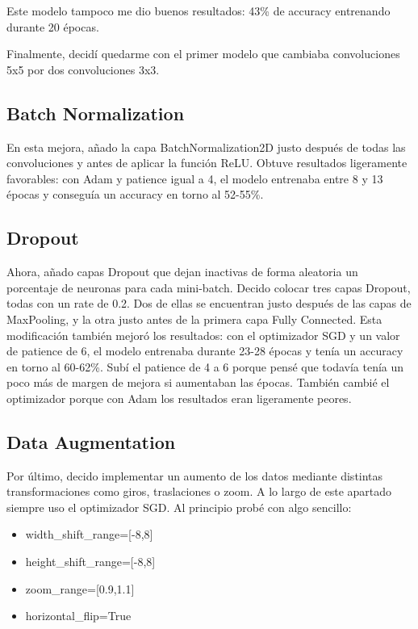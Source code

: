 \documentclass[10pt,a4paper]{article}
\begin{document}
Este modelo tampoco me dio buenos resultados: 43\% de accuracy entrenando durante 20 épocas.

Finalmente, decidí quedarme con el primer modelo que cambiaba convoluciones 5x5 por dos convoluciones 3x3.



\subsection{Batch Normalization}

En esta mejora, añado la capa BatchNormalization2D justo después de todas las convoluciones y antes de aplicar la función ReLU. Obtuve resultados ligeramente favorables: con Adam y patience igual a 4, el modelo entrenaba entre 8 y 13 épocas y conseguía un accuracy en torno al 52-55\%.



\subsection{Dropout}

Ahora, añado capas Dropout que dejan inactivas de forma aleatoria un porcentaje de neuronas para cada mini-batch. Decido colocar tres capas Dropout, todas con un rate de 0.2. Dos de ellas se encuentran justo después de las capas de MaxPooling, y la otra justo antes de la primera capa Fully Connected. Esta modificación también mejoró los resultados: con el optimizador SGD y un valor de patience de 6, el modelo entrenaba durante 23-28 épocas y tenía un accuracy en torno al 60-62\%. Subí el patience de 4 a 6 porque pensé que todavía tenía un poco más de margen de mejora si aumentaban las épocas. También cambié el optimizador porque con Adam los resultados eran ligeramente peores.



\subsection{Data Augmentation}

Por último, decido implementar un aumento de los datos mediante distintas transformaciones como giros, traslaciones o zoom. A lo largo de este apartado siempre uso el optimizador SGD. Al principio probé con algo sencillo: 

\begin{itemize}
\item width\_shift\_range=[-8,8]
\item height\_shift\_range=[-8,8]
\item zoom\_range=[0.9,1.1]
\item horizontal\_flip=True
\end{itemize}
\end{document}
